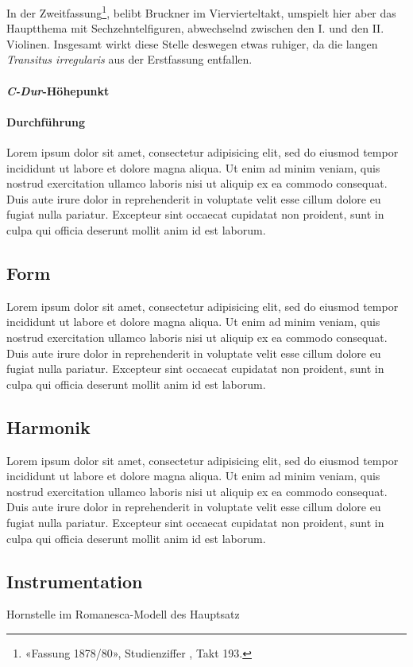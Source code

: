 In der Zweitfassung\footnote{«Fassung 1878/80», Studienziffer , Takt 193.}, belibt Bruckner im Viervierteltakt, umspielt hier aber das Hauptthema mit Sechzehntelfiguren, abwechselnd zwischen den I. und den II. Violinen.
Insgesamt wirkt diese Stelle deswegen etwas ruhiger, da die langen \emph{Transitus irregularis} aus der Erstfassung entfallen.

\paragraph{\emph{C-Dur}-Höhepunkt}


\paragraph{Durchführung}

Lorem ipsum dolor sit amet, consectetur adipisicing elit, sed do eiusmod tempor incididunt ut labore et dolore magna aliqua. Ut enim ad minim veniam, quis nostrud exercitation ullamco laboris nisi ut aliquip ex ea commodo consequat. Duis aute irure dolor in reprehenderit in voluptate velit esse cillum dolore eu fugiat nulla pariatur. Excepteur sint occaecat cupidatat non proident, sunt in culpa qui officia deserunt mollit anim id est laborum.


\subsection{Form}

Lorem ipsum dolor sit amet, consectetur adipisicing elit, sed do eiusmod tempor incididunt ut labore et dolore magna aliqua. Ut enim ad minim veniam, quis nostrud exercitation ullamco laboris nisi ut aliquip ex ea commodo consequat. Duis aute irure dolor in reprehenderit in voluptate velit esse cillum dolore eu fugiat nulla pariatur. Excepteur sint occaecat cupidatat non proident, sunt in culpa qui officia deserunt mollit anim id est laborum.


\subsection{Harmonik}

Lorem ipsum dolor sit amet, consectetur adipisicing elit, sed do eiusmod tempor incididunt ut labore et dolore magna aliqua. Ut enim ad minim veniam, quis nostrud exercitation ullamco laboris nisi ut aliquip ex ea commodo consequat. Duis aute irure dolor in reprehenderit in voluptate velit esse cillum dolore eu fugiat nulla pariatur. Excepteur sint occaecat cupidatat non proident, sunt in culpa qui officia deserunt mollit anim id est laborum.



\subsection{Instrumentation}

Hornstelle im Romanesca-Modell des Hauptsatz
